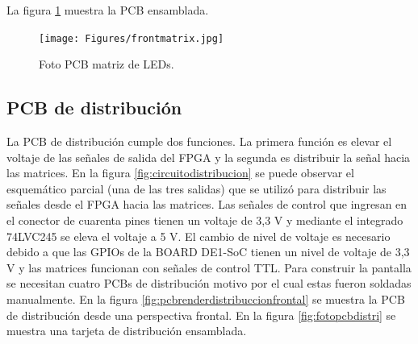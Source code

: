 La figura \ref{fig:fotomatrixled} muestra la PCB ensamblada. 

\begin{figure}[htpb]
	\centering
    \texttt{[image: Figures/frontmatrix.jpg]} 
	\caption{Foto PCB matriz de LEDs.}
	\label{fig:fotomatrixled}
\end{figure}
\pagebreak


\subsection{PCB de distribución}
La PCB de distribución cumple dos funciones. La primera función es elevar el voltaje de las señales de salida del FPGA y la segunda es distribuir la señal hacia las matrices. En la figura \ref{fig:circuitodistribucion} se puede observar el esquemático parcial (una de las tres salidas) que se utilizó para distribuir las señales desde el FPGA hacia las matrices. 
Las señales de control que ingresan en el conector de cuarenta pines tienen un voltaje de 3,3 V y mediante el integrado 74LVC245 se eleva el voltaje a 5 V. El cambio de nivel de voltaje es necesario debido a que las GPIOs de la BOARD DE1-SoC tienen un nivel de voltaje de 3,3 V y las matrices funcionan con señales de control TTL. Para construir la pantalla se necesitan cuatro PCBs de distribución motivo por el cual estas fueron soldadas manualmente. En la figura \ref{fig:pcbrenderdistribuccionfrontal}  se muestra la PCB de distribución desde una perspectiva frontal. En la figura \ref{fig:fotopcbdistri} se muestra una tarjeta de distribución ensamblada. 

